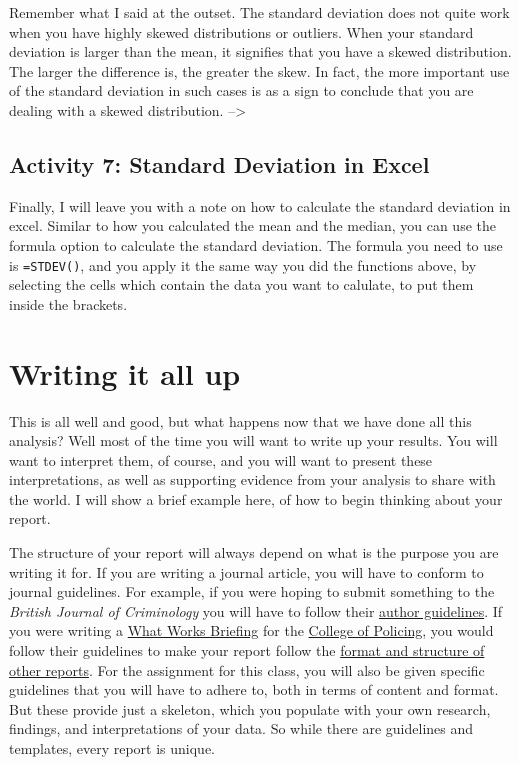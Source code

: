 \documentclass[]{book}
\theoremstyle{definition}
\theoremstyle{definition}
\theoremstyle{definition}
\theoremstyle{remark}
\begin{document}
Remember what I said at the outset. The standard deviation does not
quite work when you have highly skewed distributions or outliers. When
your standard deviation is larger than the mean, it signifies that you
have a skewed distribution. The larger the difference is, the greater
the skew. In fact, the more important use of the standard deviation in
such cases is as a sign to conclude that you are dealing with a skewed
distribution. --\textgreater{}

\hypertarget{activity-7-standard-deviation-in-excel}{%
\subsection{Activity 7: Standard Deviation in
Excel}\label{activity-7-standard-deviation-in-excel}}

Finally, I will leave you with a note on how to calculate the standard
deviation in excel. Similar to how you calculated the mean and the
median, you can use the formula option to calculate the standard
deviation. The formula you need to use is \texttt{=STDEV()}, and you
apply it the same way you did the functions above, by selecting the
cells which contain the data you want to calulate, to put them inside
the brackets.

\hypertarget{writing-it-all-up}{%
\section{Writing it all up}\label{writing-it-all-up}}

This is all well and good, but what happens now that we have done all
this analysis? Well most of the time you will want to write up your
results. You will want to interpret them, of course, and you will want
to present these interpretations, as well as supporting evidence from
your analysis to share with the world. I will show a brief example here,
of how to begin thinking about your report.

The structure of your report will always depend on what is the purpose
you are writing it for. If you are writing a journal article, you will
have to conform to journal guidelines. For example, if you were hoping
to submit something to the \emph{British Journal of Criminology} you
will have to follow their
\href{https://academic.oup.com/bjc/pages/General_Instructions}{author
guidelines}. If you were writing a
\href{http://whatworks.college.police.uk/Research/Briefings/Pages/default.aspx}{What
Works Briefing} for the
\href{http://www.college.police.uk/Pages/Home.aspx}{College of
Policing}, you would follow their guidelines to make your report follow
the
\href{http://whatworks.college.police.uk/Research/Briefings/Documents/What\%20Works\%20Street\%20Lighting\%20final\%20version\%20June\%202013.pdf}{format
and structure of other reports}. For the assignment for this class, you
will also be given specific guidelines that you will have to adhere to,
both in terms of content and format. But these provide just a skeleton,
which you populate with your own research, findings, and interpretations
of your data. So while there are guidelines and templates, every report
is unique.
\end{document}
